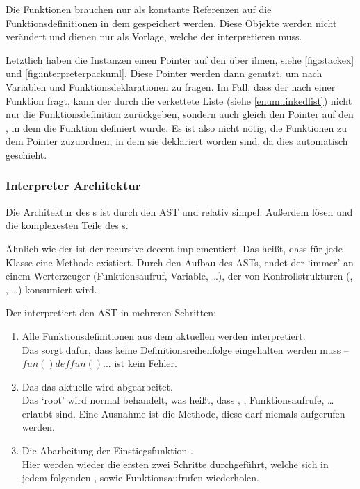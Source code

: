 {      Die Funktionen brauchen nur als konstante Referenzen auf die Funktionsdefinitionen in dem  gespeichert werden. Diese Objekte werden nicht verändert und dienen nur als Vorlage, welche der  interpretieren muss.

      Letztlich haben die  Instanzen einen Pointer auf den  über ihnen, siehe \autoref{fig:stackex} und \autoref{fig:interpreterpackuml}. Diese Pointer werden dann genutzt, um nach Variablen und Funktionsdeklarationen zu fragen. Im Fall, dass der  nach einer Funktion fragt, kann der  durch die verkettete Liste (siehe \ref{enum:linkedlist}) nicht nur die Funktionsdefinition zurückgeben, sondern auch gleich den Pointer auf den , in dem die Funktion definiert wurde. Es ist also nicht nötig, die Funktionen zu dem  Pointer zuzuordnen, in dem sie deklariert worden sind, da dies automatisch geschieht.


    \subsubsection{Interpreter Architektur}
    \label{sssec:Interpreter Architektur}
      Die Architektur des s ist durch den AST und  relativ simpel. Außerdem lösen  und  die komplexesten Teile des s.

      Ähnlich wie der  ist der  recursive decent implementiert. Das heißt, dass für jede  Klasse eine  Methode existiert. Durch den Aufbau des ASTs, endet der  `immer' an einem Werterzeuger (Funktionsaufruf, Variable, \ldots), der von Kontrollstrukturen (, , \ldots) konsumiert wird.

      Der  interpretiert den AST in mehreren Schritten:
      \begin{enumerate}
        \item Alle Funktionsdefinitionen aus dem aktuellen  werden interpretiert.\\
          Das sorgt dafür, dass keine Definitionsreihenfolge eingehalten werden muss -- \myMIn$fun() def fun() {...}$ ist kein Fehler.
        \item Das das aktuelle  wird abgearbeitet.\\
          Das `root'  wird normal behandelt, was heißt, dass , , Funktionsaufrufe, \ldots{} erlaubt sind. Eine Ausnahme ist die  Methode, diese darf niemals aufgerufen werden.
        \item Die Abarbeitung der Einstiegsfunktion .\\
          Hier werden wieder die ersten zwei Schritte durchgeführt, welche sich in jedem folgenden , sowie Funktionsaufrufen wiederholen.
      \end{enumerate}

}
